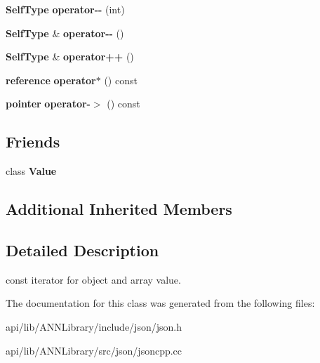 \begin{DoxyCompactItemize}
\item 
{\bf Self\+Type} {\bfseries operator-\/-\/} (int)\label{class_json_1_1_value_const_iterator_a94935961e9331c6f7b907b05ec8df75e}

\item 
{\bf Self\+Type} \& {\bfseries operator-\/-\/} ()\label{class_json_1_1_value_const_iterator_a31415e44e44e56fb2bfda7e8bb784646}

\item 
{\bf Self\+Type} \& {\bfseries operator++} ()\label{class_json_1_1_value_const_iterator_a2cfe2f7a94a688186efdafb1b181c319}

\item 
{\bf reference} {\bfseries operator$\ast$} () const \label{class_json_1_1_value_const_iterator_aeb44153d71c61ac9397a84d5ecc244c5}

\item 
{\bf pointer} {\bfseries operator-\/$>$} () const \label{class_json_1_1_value_const_iterator_ac493d31c8eede8af10b71415fe8e624b}

\end{DoxyCompactItemize}
\subsection*{Friends}
\begin{DoxyCompactItemize}
\item 
class {\bfseries Value}\label{class_json_1_1_value_const_iterator_a896c037a32087c5c20d97e64a1786880}

\end{DoxyCompactItemize}
\subsection*{Additional Inherited Members}


\subsection{Detailed Description}
const iterator for object and array value. 



The documentation for this class was generated from the following files\+:\begin{DoxyCompactItemize}
\item 
api/lib/\+A\+N\+N\+Library/include/json/json.\+h\item 
api/lib/\+A\+N\+N\+Library/src/json/jsoncpp.\+cc\end{DoxyCompactItemize}
